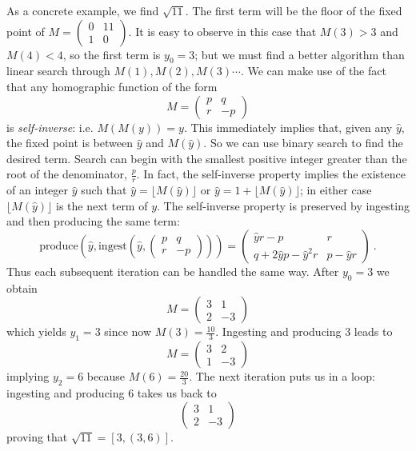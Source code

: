 \documentclass[11pt, oneside]{amsart}   	%
\renewcommand{\:}{\negthickspace:\negthickspace}
\begin{document}
As a concrete example, we find $\sqrt{11}$. The first term will be the floor of the fixed point of 
$M = \left(\begin{smallmatrix}
0 & 11 \\
1 & 0
\end{smallmatrix}\right)$. It is easy to observe in this case that $M(3)>3$ and
$M(4)<4$, so the first term is $y_0=3$; but we must find a better algorithm than linear search through
$M(1), M(2), M(3)\cdots$. We can make use of the fact that any homographic function of the form
 \[
 M = \begin{pmatrix}
p & q \\
r & -p
\end{pmatrix}
\]
 is \emph{self-inverse}: i.e. $M(M(y)) = y$. This immediately implies that,
given any $\hat{y}$, the fixed point is between $\hat{y}$ and $M(\hat{y})$.
So we can use binary search to find the desired term.
Search can begin with the smallest positive integer greater than the root of the denominator, $\frac{p}{r}$.
In fact, the self-inverse property implies the existence of an integer $\hat{y}$ such that $\hat{y} = \lfloor M(\hat{y}) \rfloor$ or $\hat{y} = 1 + \lfloor M(\hat{y}) \rfloor$; in either case $\lfloor M(\hat{y}) \rfloor$ is the next term of $y$. 
The self-inverse property is preserved by ingesting and then producing the same term:
\[
\mbox{produce}\left(\hat{y}, \mbox{ingest}\left(\hat{y},   \left(\begin{smallmatrix}
p & q \\
r & -p
\end{smallmatrix}\right)\right)     \right) = 
\left(\begin{smallmatrix}
 \hat{y}r-p              & r  \\
q+2\hat{y}p-\hat{y}^2r & p-\hat{y}r
\end{smallmatrix}\right)\ .
\]
Thus each subsequent iteration can be handled the same way. After $y_0=3$ we obtain
\[
M= \begin{pmatrix}
3 & 1 \\
2 & -3
\end{pmatrix}
\]
which yields $y_1=3$ since now $M(3)=\frac{10}{3}$. Ingesting and producing 3 leads to
\[
M= \begin{pmatrix}
3 & 2 \\
1 & -3
\end{pmatrix}
\]
implying $y_2=6$ because $M(6)=\frac{20}{3}$. The next iteration puts us in a loop: ingesting
and producing 6 takes us back to 
\[
 \begin{pmatrix}
3 & 1 \\
2 & -3
\end{pmatrix}
\]
proving that $\sqrt{11} = [3, (3,6)]$.
\end{document}

